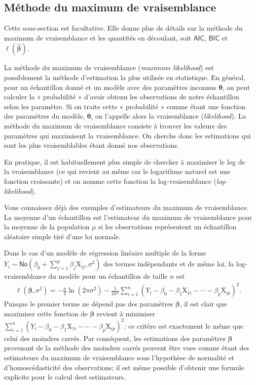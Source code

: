 \documentclass[
  11pt,
  letterpaper,
]{book}
\theoremstyle{definition}
\theoremstyle{remark}
\begin{document}
\hypertarget{muxe9thode-du-maximum-de-vraisemblance}{%
\subsection{Méthode du maximum de
vraisemblance}\label{muxe9thode-du-maximum-de-vraisemblance}}

Cette sous-section est facultative. Elle donne plus de détails sur la
méthode du maximum de vraisemblance et les quantités en découlant, soit
\(\mathsf{AIC}\), \(\mathsf{BIC}\) et
\(\ell(\widehat{\boldsymbol{\beta}})\).

La méthode du maximum de vraisemblance (\emph{maximum likelihood}) est
possiblement la méthode d'estimation la plus utilisée en statistique. En
général, pour un échantillon donné et un modèle avec des paramètres
inconnus \(\boldsymbol{\theta}\), on peut calculer la « probabilité »
d'avoir obtenu les observations de notre échantillon selon les
paramètre. Si on traite cette « probabilité » comme étant une fonction
des paramètres du modèle, \(\boldsymbol{\theta}\), on l'appelle alors la
vraisemblance (\emph{likelihood}). La méthode du maximum de
vraisemblance consiste à trouver les valeurs des paramètres qui
maximisent la vraisemblance. On cherche donc les estimations qui sont
les plus vraisemblables étant donné nos observations.

En pratique, il est habituellement plus simple de chercher à maximiser
le log de la vraisemblance (ce qui revient au même car le logarithme
naturel est une fonction croissante) et on nomme cette fonction la
log-vraisemblance (\emph{log-likelihood}).

Vous connaissez déjà des exemples d'estimateurs du maximum de
vraisemblance. La moyenne d'un échantillon est l'estimateur du maximum
de vraisemblance pour la moyenne de la population \(\mu\) si les
observations représentent un échantillon aléatoire simple tiré d'une loi
normale.

Dans le cas d'un modèle de régression linéaire multiple de la forme
\(Y_i \sim \mathsf{No}(\beta_0 + \sum_{j=1}^p \beta_j\mathrm{X}_{ij}, \sigma^2)\)
des termes indépendants et de même loi, la log-vraisemblance du modèle
pour un échantillon de taille \(n\) est \begin{align*}
 \ell(\boldsymbol{\beta}, \sigma^2) =- \frac{n}{2} \ln(2\pi\sigma^2) - \frac{1}{2\sigma^2}\sum_{i=1}^n (Y_i- \beta_0 - \beta_1 \mathrm{X}_{1i} - \cdots - \beta_p\mathrm{X}_{ip})^2.
\end{align*} Puisque le premier terme ne dépend pas des paramètres
\(\boldsymbol{\beta}\), il est clair que maximiser cette fonction de
\(\boldsymbol{\beta}\) revient à minimiser
\(\sum_{i=1}^n (Y_i- \beta_0 - \beta_1 \mathrm{X}_{1i} - \cdots - \beta_p\mathrm{X}_{ip})^2\):
ce critère est exactement le même que celui des moindres carrés. Par
conséquent, les estimations des paramètres \(\boldsymbol{\beta}\)
provenant de la méthode des moindres carrés peuvent être vues comme
étant des estimateurs du maximum de vraisemblance sous l'hypothèse de
normalité et d'homoscédasticité des observations; il est même possible
d'obtenir une formule explicite pour le calcul dest estimateurs.
\end{document}
